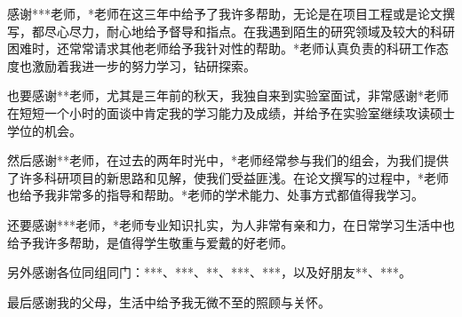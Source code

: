 \documentclass[promaster]{thesis-uestc}
\begin{document}
感谢***老师，*老师在这三年中给予了我许多帮助，无论是在项目工程或是论文撰写，都尽心尽力，耐心地给予督导和指点。在我遇到陌生的研究领域及较大的科研困难时，还常常请求其他老师给予我针对性的帮助。*老师认真负责的科研工作态度也激励着我进一步的努力学习，钻研探索。

也要感谢**老师，尤其是三年前的秋天，我独自来到实验室面试，非常感谢*老师在短短一个小时的面谈中肯定我的学习能力及成绩，并给予在实验室继续攻读硕士学位的机会。

然后感谢**老师，在过去的两年时光中，*老师经常参与我们的组会，为我们提供了许多科研项目的新思路和见解，使我们受益匪浅。在论文撰写的过程中，*老师也给予我非常多的指导和帮助。*老师的学术能力、处事方式都值得我学习。

还要感谢***老师，*老师专业知识扎实，为人非常有亲和力，在日常学习生活中也给予我许多帮助，是值得学生敬重与爱戴的好老师。

另外感谢各位同组同门：***、***、**、***、***，以及好朋友**、***。

最后感谢我的父母，生活中给予我无微不至的照顾与关怀。


\nocite{*}

%
% 
%
% 
% 
%

\end{document}
